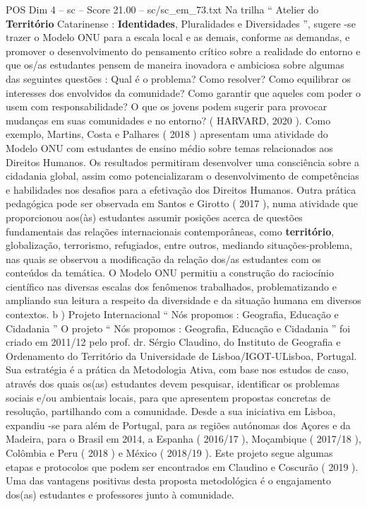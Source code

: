 \begin{textsample}{POS Dim 4 – sc – Score 21.00 – sc/sc\_em\_73.txt}
Na trilha “ Atelier do \textbf{Território} Catarinense : \textbf{Identidades}, Pluralidades e Diversidades ”, sugere -se trazer o Modelo ONU para a escala local e as demais, conforme as demandas, e promover o desenvolvimento do pensamento crítico sobre a realidade do entorno e que os/as estudantes pensem de maneira inovadora e ambiciosa sobre algumas das seguintes questões : Qual é o problema?
Como resolver?
Como equilibrar os interesses dos envolvidos da comunidade?
Como garantir que aqueles com poder o usem com responsabilidade?
O que os jovens podem sugerir para provocar mudanças em suas comunidades e no entorno? ( HARVARD, 2020 ).
Como exemplo, Martins, Costa e Palhares ( 2018 ) apresentam uma atividade do Modelo ONU com estudantes de ensino médio sobre temas relacionados aos Direitos Humanos.
Os resultados permitiram desenvolver uma consciência sobre a cidadania global, assim como potencializaram o desenvolvimento de competências e habilidades nos desafios para a efetivação dos Direitos Humanos.
Outra prática pedagógica pode ser observada em Santos e Girotto ( 2017 ), numa atividade que proporcionou aos(às) estudantes assumir posições acerca de questões fundamentais das relações internacionais contemporâneas, como \textbf{território}, globalização, terrorismo, refugiados, entre outros, mediando situações-problema, nas quais se observou a modificação da relação dos/as estudantes com os conteúdos da temática.
O Modelo ONU permitiu a construção do raciocínio científico nas diversas escalas dos fenômenos trabalhados, problematizando e ampliando sua leitura a respeito da diversidade e da situação humana em diversos contextos. b ) Projeto Internacional “ Nós propomos : Geografia, Educação e Cidadania ” O projeto “ Nós propomos : Geografia, Educação e Cidadania ” foi criado em 2011/12 pelo prof. dr.
Sérgio Claudino, do Instituto de Geografia e Ordenamento do Território da Universidade de Lisboa/IGOT-ULisboa, Portugal.
Sua estratégia é a prática da Metodologia Ativa, com base nos estudos de caso, através dos quais os(as) estudantes devem pesquisar, identificar os problemas sociais e/ou ambientais locais, para que apresentem propostas concretas de resolução, partilhando com a comunidade.
Desde a sua iniciativa em Lisboa, expandiu -se para além de Portugal, para as regiões autónomas dos Açores e da Madeira, para o Brasil em 2014, a Espanha ( 2016/17 ), Moçambique ( 2017/18 ), Colômbia e Peru ( 2018 ) e México ( 2018/19 ).
Este projeto segue algumas etapas e protocolos que podem ser encontrados em Claudino e Coscurão ( 2019 ).
Uma das vantagens positivas desta proposta metodológica é o engajamento dos(as) estudantes e professores junto à comunidade.

\end{textsample}
